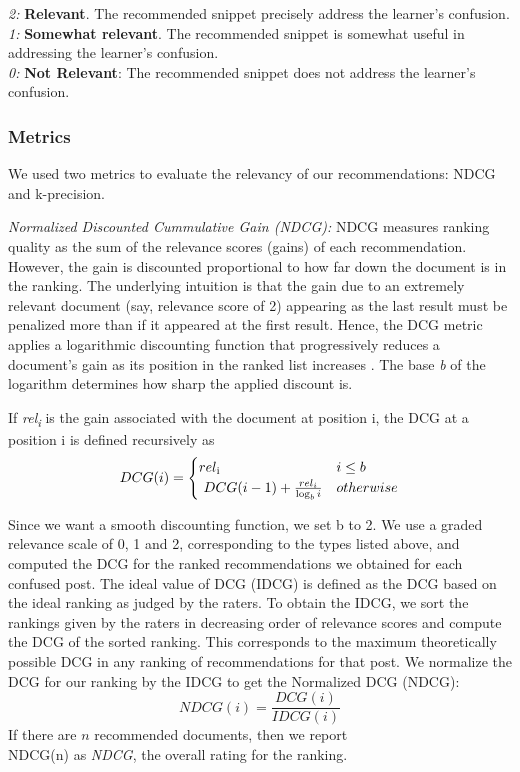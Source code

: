 \documentclass{edm_template}
\begin{document}
\textit{2:} {\bf Relevant}. The recommended snippet precisely address the learner's confusion.\\
\textit{1:} {\bf Somewhat relevant}. The recommended snippet is somewhat useful in addressing the learner's confusion.\\
\textit{0:} {\bf Not Relevant}: The recommended snippet does not address the learner's confusion.

\subsubsection{Metrics}
We used two metrics to evaluate the relevancy of our recommendations: NDCG and k-precision.

\textit{Normalized Discounted Cummulative Gain (NDCG):}
NDCG measures ranking quality as the sum of the relevance scores (gains) of each recommendation. However, the gain is discounted proportional to how far down the document is in the ranking. The underlying intuition is that the gain due to an extremely relevant document (say, relevance score of 2) appearing as the last result must be penalized more than if it appeared at the first result. Hence, the DCG metric applies a logarithmic discounting function that progressively reduces a document's gain as its position in the ranked list increases \cite{ndcgcite}. The base \textit{b} of the logarithm determines how sharp the applied discount is.

If \textit{rel\textsubscript i} is the gain associated with the document at position i, the DCG at a position i is defined recursively as
\begin{equation}
DCG(i) =
\begin{cases}
rel \textsubscript i & i \le b  \\
\ DCG(i-1) + \frac{rel_i}{\log_b{i}} & otherwise \\
\end{cases}
\end{equation}

Since we want a smooth discounting function, we set b to 2. We use a graded relevance scale of 0, 1 and 2, corresponding to the types listed above, and computed the DCG for the ranked recommendations we obtained for each confused post. The ideal value of DCG (IDCG) is defined as the DCG based on the ideal ranking as judged by the raters. To obtain the IDCG, we sort the rankings given by the raters in decreasing order of relevance scores and compute the DCG of the sorted ranking. This corresponds to the maximum theoretically possible DCG in any ranking of recommendations for that post. We normalize the DCG for our ranking by the IDCG to get the Normalized DCG (NDCG):
\begin{equation}
NDCG(i) = \frac{DCG(i)}{IDCG(i)}
\end{equation}
If there are $n$ recommended documents, then we report\\NDCG(n) as \emph{NDCG}, the overall rating for the ranking. 
\end{document}
